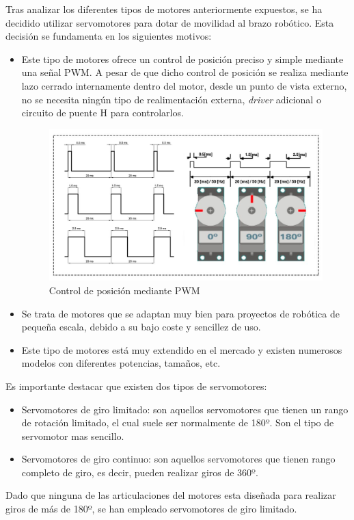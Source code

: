 Tras analizar los diferentes tipos de motores anteriormente expuestos, se ha decidido utilizar servomotores para dotar de movilidad al brazo robótico. Esta decisión se fundamenta en los siguientes motivos:
\begin{itemize}
    \item Este tipo de motores ofrece un control de posición preciso y simple mediante una señal PWM. A pesar de que dicho control de posición se realiza mediante lazo cerrado internamente dentro del motor, desde un punto de vista externo, no se necesita ningún tipo de realimentación externa, \textit{driver} adicional o circuito de puente H para controlarlos.
    
    \begin{figure}[h!]
    \centering 
    \includegraphics[width=.6\linewidth]{pictures/Senal_PWM.jpg}
    \caption{Control de posición mediante PWM}
    \label{fig:}
    \end{figure}

    
    \item Se trata de motores que se adaptan muy bien para proyectos de robótica de pequeña escala, debido a su bajo coste y sencillez de uso.
    
    \item Este tipo de motores está muy extendido en el mercado y existen numerosos modelos con diferentes potencias, tamaños, etc.
\end{itemize}

Es importante destacar que existen dos tipos de servomotores:
\begin{itemize}
    \item Servomotores de giro limitado: son aquellos servomotores que tienen un rango de rotación limitado, el cual suele ser normalmente de 180º. Son el tipo de servomotor mas sencillo.
    \item Servomotores de giro continuo: son aquellos servomotores que tienen rango completo de giro, es decir, pueden realizar giros de 360º.
\end{itemize}

Dado que ninguna de las articulaciones del motores esta diseñada para realizar giros de más de 180º, se han empleado servomotores de giro limitado.

